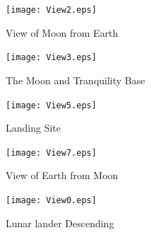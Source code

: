 \documentclass[onecolumn, draftclsnofoot,10pt, compsoc]{IEEEtran}
\begin{document}
\begin{figure}[!htb]
    \centering
    \texttt{[image: View2.eps]}
    \caption{View of Moon from Earth}

\end{figure}

\begin{figure}[!htb]
    \centering
    \texttt{[image: View3.eps]}
    \caption{The Moon and Tranquility Base}

\end{figure}

\begin{figure}[!htb]
    \centering
    \texttt{[image: View5.eps]}  \caption{Landing Site}
\end{figure}

\begin{figure}[!htb]
    \centering
    \texttt{[image: View7.eps]}
    \caption{View of Earth from Moon}
\end{figure}

\begin{figure}[!htb]
    \centering
    \texttt{[image: View0.eps]}  \caption{Lunar lander Descending}
\end{figure}
\end{document}
